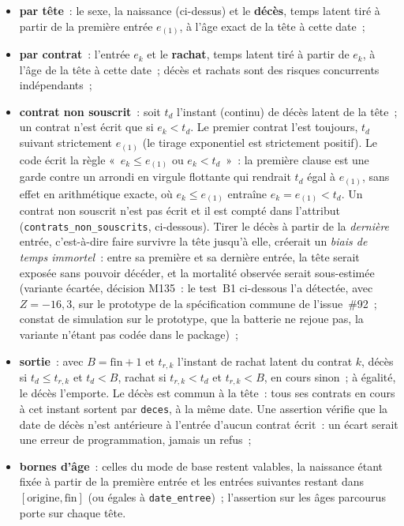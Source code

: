 \documentclass[a4paper,11pt]{article}
\newcommand{\code}[1]{\texttt{\small #1}}
\begin{document}
\begin{itemize}[leftmargin=*, itemsep=2pt]
  \item \textbf{par tête}~: le sexe, la naissance (ci-dessus) et le
    \textbf{décès}, temps latent tiré à partir de la première entrée
    $e_{(1)}$, à l'âge exact de la tête à cette date~;
  \item \textbf{par contrat}~: l'entrée $e_k$ et le \textbf{rachat}, temps
    latent tiré à partir de $e_k$, à l'âge de la tête à cette date~; décès et
    rachats sont des risques concurrents indépendants~;
  \item \textbf{contrat non souscrit}~: soit $t_d$ l'instant (continu) de
    décès latent de la tête~; un contrat n'est écrit que si $e_k < t_d$. Le
    premier contrat l'est toujours, $t_d$ suivant strictement $e_{(1)}$ (le
    tirage exponentiel est strictement positif). Le code écrit la règle
    «~$e_k \le e_{(1)}$ ou $e_k < t_d$~»~: la première clause est une garde
    contre un arrondi en virgule flottante qui rendrait $t_d$ égal à
    $e_{(1)}$, sans effet en arithmétique exacte, où $e_k \le e_{(1)}$
    entraîne $e_k = e_{(1)} < t_d$. Un contrat non souscrit n'est pas écrit
    et il est compté dans l'attribut (\code{contrats\_non\_souscrits},
    ci-dessous). Tirer le décès à partir de la \emph{dernière} entrée,
    c'est-à-dire faire survivre la tête jusqu'à elle, créerait un
    \emph{biais de temps immortel}~: entre sa première et sa dernière entrée,
    la tête serait exposée sans pouvoir décéder, et la mortalité observée
    serait sous-estimée (variante écartée, décision M135~: le test~B1
    ci-dessous l'a détectée, avec $Z = -16{,}3$, sur le prototype de la
    spécification commune de l'issue~\#92~; constat de simulation sur le
    prototype, que la batterie ne rejoue pas, la variante n'étant pas codée
    dans le package)~;
  \item \textbf{sortie}~: avec $B = \text{fin} + 1$ et $t_{r,k}$ l'instant de
    rachat latent du contrat $k$, décès si $t_d \le t_{r,k}$ et $t_d < B$,
    rachat si $t_{r,k} < t_d$ et $t_{r,k} < B$, en cours sinon~; à égalité,
    le décès l'emporte. Le décès est commun à la tête~: tous ses contrats en
    cours à cet instant sortent par \code{deces}, à la même date. Une
    assertion vérifie que la date de décès n'est antérieure à l'entrée
    d'aucun contrat écrit~: un écart serait une erreur de programmation,
    jamais un refus~;
  \item \textbf{bornes d'âge}~: celles du mode de base restent valables, la
    naissance étant fixée à partir de la première entrée et les entrées
    suivantes restant dans $[\text{origine}, \text{fin}]$ (ou égales à
    \code{date\_entree})~; l'assertion sur les âges parcourus porte sur
    chaque tête.
\end{itemize}
\end{document}
